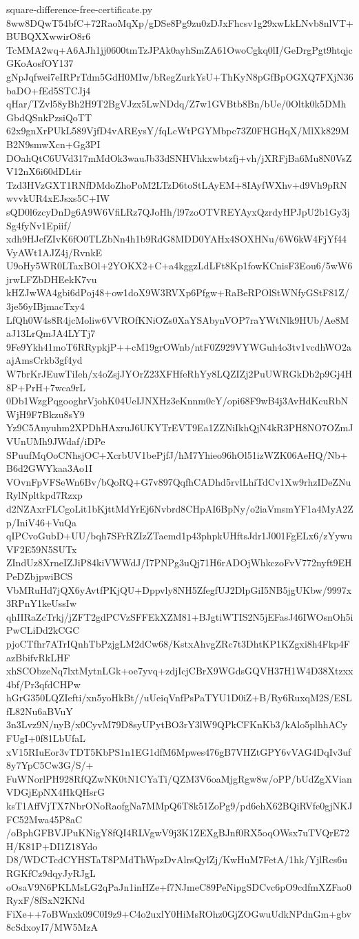 \documentclass[11pt]{article}
\theoremstyle{definition}
\theoremstyle{remark}
\begin{document}
\begin{filecontents*}[overwrite]{square-difference-free-certificate.py}
8ww8DQwT54bfC+72RaoMqXp/gDSe8Pg9zu0zDJxFhcsv1g29xwLkLNvb8nlVT+BUBQXXwwirO8r6
TcMMA2wq+A6AJh1jj0600tmTzJPAk0ayhSmZA61OwoCgkq0lI/GeDrgPgt9htqjcGKoAosfOY137
gNpJqfwei7eIRPrTdm5GdH0MIw/bRegZurkYsU+ThKyN8pGfBpOGXQ7FXjN36baDO+fEd5STCJj4
qHar/TZvl58yBh2H9T2BgVJzx5LwNDdq/Z7w1GVBtb8Bn/bUe/0Oltk0k5DMhGbdQSnkPzsiQoTT
62x9gnXrPUkL589VjfD4vAREysY/fqLcWtPGYMbpc73Z0FHGHqX/MlXk829MB2N9smwXcn+Gg3PI
DOahQtC6UVd317mMdOk3wauJb33dSNHVhkxwbtzfj+vh/jXRFjBa6Mu8N0VsZV12nX6i60dDLtir
Tzd3HVzGXT1RNfDMdoZhoPoM2LTzD6toStLAyEM+8IAyfWXhv+d9Vh9pRNwvvkUR4xEJsxs5C+IW
sQD0l6zcyDnDg6A9W6VfiLRz7QJoHh/l97zoOTVREYAyxQzrdyHPJpU2b1Gy3jSg4fyNv1Epiif/
xdh9HJefZIvK6fO0TLZbNn4h1b9RdG8MDD0YAHx4SOXHNu/6W6kW4FjYf44VyAWt1AJZ4j/RvnkE
U9oHy5WR0LTaxBOl+2YOKX2+C+a4kggzLdLFt8Kp1fowKCnisF3Eou6/5wW6jrwLFZbDHEekK7vu
kHZJwWA4gbi6dPoj48+ow1doX9W3RVXp6Pfgw+RaBeRPOlStWNfyGStF81Z/3je56yIBjmacTxy4
LfQh0W4s8R4jcMoliw6VVROfKNiOZs0XaYSAbynVOP7raYWtNlk9HUb/Ae8MaJ13LrQmJA4LYTj7
9Fe9Ykh41moT6RRypkjP++cM19grOWnb/ntF0Z929VYWGuh4o3tv1vcdhWO2aajAmsCrkb3gf4yd
W7brKrJEuwTiIeh/x4oZsjJYOrZ23XFHfeRhYy8LQZIZj2PuUWRGkDb2p9Gj4H8P+PrH+7wca9rL
0Db1WzgPqgooghrVjohK04UeIJNXHz3eKnnm0cY/opi68F9wB4j3AvHdKcuRbNWjH9F7Bkzu8sY9
Yz9C5Anyuhm2XPDhHAxruJ6UKYTrEVT9Ea1ZZNiIkhQjN4kR3PH8NO7OZmJVUnUMh9JWdaf/iDPe
SPuufMqOoCNhsjOC+XcrbUV1bePjfJ/hM7Yhieo96hOl51izWZK06AeHQ/Nb+B6d2GWYkaa3Ao1I
VOvnFpVFSeWn6Bv/bQoRQ+G7v897QqfhCADhd5rvlLhiTdCv1Xw9rhzIDeZNuRylNpltkpd7Rzxp
d2NZAxrFLCgoLit1bKjttMdYrEj6Nvbrd8CHpAI6BpNy/o2iaVmsmYF1a4MyA2Zp/IniV46+VuQa
qIPCvoGubD+UU/bqh7SFrRZIzZTaemd1p43phpkUHftsJdr1J001FgELx6/zYywuVF2E59N5SUTx
ZIndUz8XrneIZJiP84kiVWWdJ/I7PNPg3uQj71H6rADOjWhkczoFvV772nyft9EHPeDZbjpwiBCS
VbMRuHd7jQX6yAvtfPKjQU+Dppvly8NH5ZfegfUJ2DlpGiI5NB5jgUKbw/9997x3RPnY1keUssIw
qhIIRaZcTrkj/jZFT2gdPCVzSFFEkXZM81+BJgtiWTIS2N5jEFasJ46IWOsnOh5iPwCLiDd2kCGC
pjoCTfhr7ATrIQnhTbPzjgLM2dCw68/KstxAhvgZRc7t3DhtKP1KZgxi8h4Fkp4FazBbifvRkLHF
xhSCObzeNq7lxtMytnLGk+oe7yvq+zdjIcjCBrX9WGdsGQVH37H1W4D38Xtzxx4bf/Pr3qfdCHPw
hGrG350LQZIefti/xn5yoHkBt//uUeiqVnfPsPaTYU1D0iZ+B/Ry6RuxqM2S/ESLfL82Nu6aBVuY
3n3Lvz9N/nyB/x0CyvM79D8syUPytBO3rY3lW9QPkCFKnKb3/kAlo5plhhACyFUgI+0f81LbUfaL
xV15RIuEor3vTDT5KbPS1n1EG1dfM6Mpwes476gB7VHZtGPY6vVAG4DqIv3uf8y7YpC5Cw3G/S/+
FuWNorlPH928RfQZwNK0tN1CYaTi/QZM3V6oaMjgRgw8w/oPP/bUdZgXVianVDGjEpNX4HkQHsrG
ksT1AffVjTX7NbrONoRaofgNa7MMpQ6T8k51ZoPg9/pd6ehX62BQiRVfe0gjNKJFC52Mwa45P8aC
/oBphGFBVJPuKNigY8fQI4RLVgwV9j3K1ZEXgBJnf0RX5oqOWsx7uTVQrE72H/K81P+DI1Z18Ydo
D8/WDCTcdCYHSTaT8PMdThWpzDvAlrsQylZj/KwHuM7FetA/1hk/YjlRcs6uRGKfCz9dqyJyRJgL
oOsaV9N6PKLMsLG2qPaJn1inHZe+f7NJmeC89PeNipgSDCvc6pO9cdfmXZFao0RyxF/8fSxN2KNd
FiXe++7oBWnxk09C0I9z9+C4o2uxlY0HiMsROhz0GjZOGwuUdkNPdnGm+gbv8cSdxoyI7/MW5MzA

\end{filecontents*}
\end{document}
